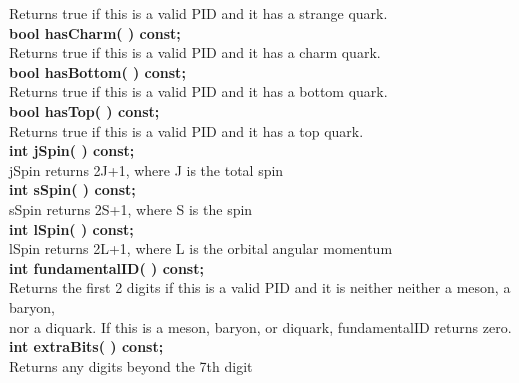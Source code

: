 \begin{tabbing}
\hspace{1.0in}  Returns true if this is a valid PID and it has a strange quark.\\
\hspace{0.5in}  {\bf bool hasCharm( )   const; }\\
\hspace{1.0in}  Returns true if this is a valid PID and it has a charm quark.\\
\hspace{0.5in}  {\bf bool hasBottom( )  const; }\\
\hspace{1.0in}  Returns true if this is a valid PID and it has a bottom quark.\\
\hspace{0.5in}  {\bf bool hasTop( )     const; }\\
\hspace{1.0in}  Returns true if this is a valid PID and it has a top quark.\\
\hspace{0.5in}  {\bf int  jSpin( )        const; }\\
\hspace{1.0in}  jSpin returns 2J+1, where J is the total spin \\
\hspace{0.5in}  {\bf int  sSpin( )        const; }\\
\hspace{1.0in}  sSpin returns 2S+1, where S is the spin \\
\hspace{0.5in}  {\bf int  lSpin( )        const; }\\
\hspace{1.0in}  lSpin returns 2L+1, where L is the orbital angular momentum \\
\hspace{0.5in}  {\bf int fundamentalID( ) const; }\\
\hspace{1.0in}  Returns the first 2 digits if this is a valid PID and it is neither
                neither a meson, a baryon, \\
\hspace{1.0in}	nor a diquark.  If this is a meson, baryon, or
		diquark, fundamentalID returns zero. \\
\hspace{0.5in}  {\bf int extraBits( ) const; }\\
\hspace{1.0in}  Returns any digits beyond the 7th digit 

\end{tabbing}

